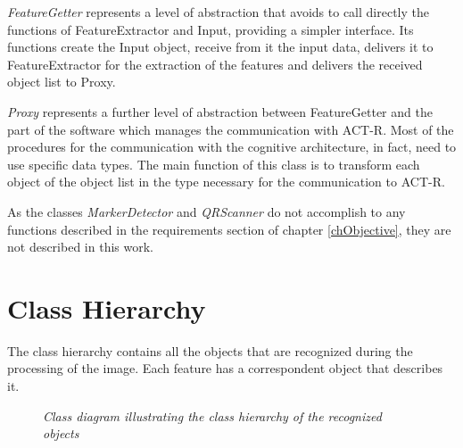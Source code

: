 		\emph{FeatureGetter} represents a level of abstraction that avoids to call directly the functions of FeatureExtractor and Input, providing a simpler interface. Its functions create the Input object, receive from it the input data, delivers it to FeatureExtractor for the extraction of the features and delivers the received object list to Proxy.

		\emph{Proxy} represents a further level of abstraction between FeatureGetter and the part of the software which manages the communication with ACT-R. Most of the procedures for the communication with the cognitive architecture, in fact, need to use specific data types. The main function of this class is to transform each object of the object list in the type necessary for the communication to ACT-R.

		As the classes \emph{MarkerDetector} and \emph{QRScanner} do not accomplish to any functions described in the requirements section of chapter \ref{chObjective}, they are not described in this work.

		

		\section{Class Hierarchy}\label{classHierarchy}
		The class hierarchy contains all the objects that are recognized during the processing of the image. Each feature has a correspondent object that describes it. 
	
		\begin{figure}[h]
		  \begin{center} 
		  \end{center} 
		  \caption{\textit{Class diagram illustrating the class hierarchy of the recognized objects}}  
		  \label{fig:HierarchyDesign}
	 	\end{figure}

